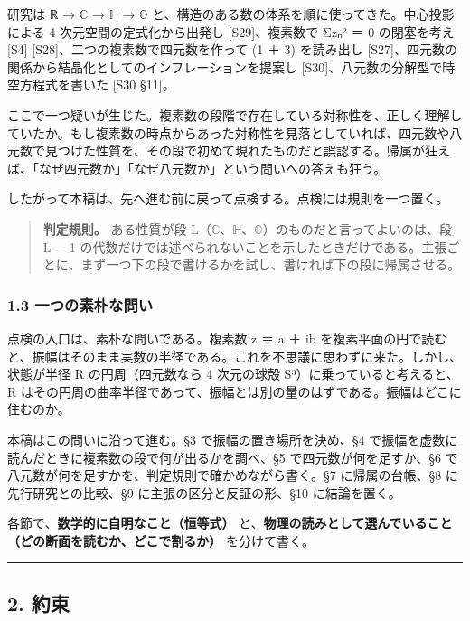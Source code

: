 \documentclass[
  a4paper,
]{ltjsarticle}
\begin{document}
研究は ℝ → \(\mathbb{C}\) → \(\mathbb{H}\) → \(\mathbb{O}\)
と、構造のある数の体系を順に使ってきた。中心投影による 4
次元空間の定式化から出発し {[}S29{]}、複素数で Σzₙ² ＝ 0 の閉塞を考え
{[}S4{]} {[}S28{]}、二つの複素数で四元数を作って (1 ＋ 3) を読み出し
{[}S27{]}、四元数の関係から結晶化としてのインフレーションを提案し
{[}S30{]}、八元数の分解型で時空方程式を書いた {[}S30 §11{]}。

ここで一つ疑いが生じた。複素数の段階で存在している対称性を、正しく理解していたか。もし複素数の時点からあった対称性を見落としていれば、四元数や八元数で見つけた性質を、その段で初めて現れたものだと誤認する。帰属が狂えば、「なぜ四元数か」「なぜ八元数か」という問いへの答えも狂う。

したがって本稿は、先へ進む前に戻って点検する。点検には規則を一つ置く。

\begin{quote}
\textbf{判定規則。} ある性質が段
L（\(\mathbb{C}\)、\(\mathbb{H}\)、\(\mathbb{O}\)）のものだと言ってよいのは、段
L − 1
の代数だけでは述べられないことを示したときだけである。主張ごとに、まず一つ下の段で書けるかを試し、書ければ下の段に帰属させる。
\end{quote}

\subsubsection{1.3
一つの素朴な問い}\label{ux4e00ux3064ux306eux7d20ux6734ux306aux554fux3044}

点検の入口は、素朴な問いである。複素数 z ＝ a ＋ ib
を複素平面の円で読むと、振幅はそのまま実数の半径である。これを不思議に思わずに来た。しかし、状態が半径
R の円周（四元数なら 4 次元の球殻 S³）に乗っていると考えると、R
はその円周の曲率半径であって、振幅とは別の量のはずである。振幅はどこに住むのか。

本稿はこの問いに沿って進む。§3 で振幅の置き場所を決め、§4
で振幅を虚数に読んだときに複素数の段で何が出るかを調べ、§5
で四元数が何を足すか、§6
で八元数が何を足すかを、判定規則で確かめながら書く。§7 に帰属の台帳、§8
に先行研究との比較、§9 に主張の区分と反証の形、§10 に結論を置く。

各節で、\textbf{数学的に自明なこと（恒等式）}
と、\textbf{物理の読みとして選んでいること（どの断面を読むか、どこで割るか）}
を分けて書く。

\begin{center}\rule{0.5\linewidth}{0.5pt}\end{center}

\subsection{2. 約束}\label{ux7d04ux675f}
\end{document}
